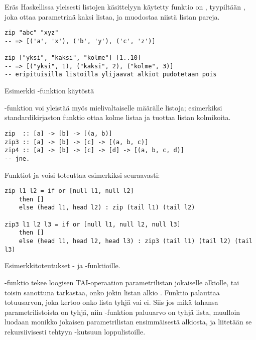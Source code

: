 Eräs Haskellissa yleisesti listojen käsittelyyn käytetty funktio on ,
tyypiltään ,
joka ottaa parametrinä kaksi listaa,
ja muodostaa niistä listan pareja.

\begin{listing}[H]
\begin{verbatim}
zip "abc" "xyz"
-- => [('a', 'x'), ('b', 'y'), ('c', 'z')]

zip ["yksi", "kaksi", "kolme"] [1..10]
-- => [("yksi", 1), ("kaksi", 2), ("kolme", 3)]
-- eripituisilla listoilla ylijaavat alkiot pudotetaan pois
\end{verbatim}
\label{lst:zip-example}
\caption{Esimerkki -funktion käytöstä}
\end{listing}

-funktion voi yleistää myös mielivaltaiselle määrälle listoja;
esimerkiksi standardikirjaston funktio  ottaa kolme listaa ja tuottaa listan kolmikoita.

\begin{verbatim}
zip  :: [a] -> [b] -> [(a, b)]
zip3 :: [a] -> [b] -> [c] -> [(a, b, c)]
zip4 :: [a] -> [b] -> [c] -> [d] -> [(a, b, c, d)]
-- jne.
\end{verbatim}

Funktiot  ja  voisi toteuttaa esimerkiksi seuraavasti:

\begin{listing}[H]
\begin{verbatim}
zip l1 l2 = if or [null l1, null l2]
    then []
    else (head l1, head l2) : zip (tail l1) (tail l2)

zip3 l1 l2 l3 = if or [null l1, null l2, null l3]
    then []
    else (head l1, head l2, head l3) : zip3 (tail l1) (tail l2) (tail l3)
\end{verbatim}
\label{lst:zip-impl}
\caption{Esimerkkitoteutukset - ja -funktioille.}
\end{listing}

-funktio  tekee loogisen TAI-operaation parametrilistan
jokaiselle alkiolle,
tai toisin sanottuna tarkastaa, onko jokin listan alkio .
Funktio  palauttaa totuusarvon, joka kertoo onko lista tyhjä vai ei.
Siis jos mikä tahansa parametrilistoista on tyhjä, niin -funktion paluuarvo on tyhjä lista,
muulloin luodaan monikko jokaisen parametrilistan ensimmäisestä alkiosta,
ja liitetään se rekursiivisesti tehtyyn -kutsuun loppulistoille.

